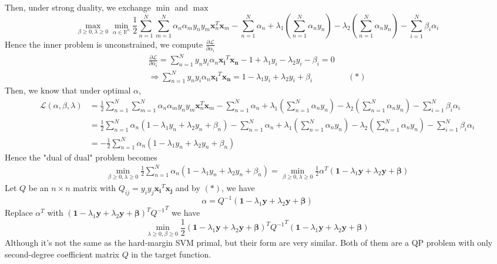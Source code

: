 \documentclass{article}
\begin{document}
\begin{CJK*}{UTF8}{bsmi}
\begin{normalsize}
\begin{enumerate}[label=\textbf{\arabic*}.]
        Then, under strong duality, we exchange $\min$ and $\max$
        \[ \max_{\beta \ge 0, \lambda \ge 0}\min_{\alpha \in \mathbb{R}^n}  \frac{1}{2}\sum_{n=1}^N\sum_{m=1}^N \alpha_n \alpha_m y_n y_m \mathbf{x}_n^T\mathbf{x}_m - \sum_{n=1}^N \alpha_n + \lambda_1(\sum_{n=1}^N \alpha_n y_n) - \lambda_2(\sum_{n=1}^N \alpha_n y_n) - \sum_{i=1}^N \beta_i \alpha_i  \]
        Hence the inner problem is unconstrained, we compute $\frac{\partial \mathcal{L}}{\partial \alpha_i}$
        \begin{align*} \frac{\partial \mathcal{L}}{\partial \alpha_i} = \sum_{n=1}^N y_n y_i \alpha_n \mathbf{x_i}^T\mathbf{x_n} - 1 + \lambda_1 y_i - \lambda_2 y_i - \beta_i = 0\\ \Rightarrow \sum_{n=1}^N y_n y_i \alpha_n \mathbf{x_i}^T\mathbf{x_n} = 1 - \lambda_1 y_i + \lambda_2 y_i + \beta_i && (*) \end{align*}
        Then, we know that under optimal $\alpha$,
        \begin{align*}
            \mathcal{L}(\alpha, \beta, \lambda) &= \frac{1}{2}\sum_{n=1}^N\sum_{m=1}^N \alpha_n \alpha_m y_n y_m \mathbf{x}_n^T\mathbf{x}_m - \sum_{n=1}^N \alpha_n + \lambda_1(\sum_{n=1}^N \alpha_n y_n) - \lambda_2(\sum_{n=1}^N \alpha_n y_n) - \sum_{i=1}^N \beta_i \alpha_i\\
            &= \frac{1}{2}\sum_{n=1}^N \alpha_n (1-\lambda_1 y_n + \lambda_2 y_n + \beta_n) - \sum_{n=1}^N \alpha_n + \lambda_1(\sum_{n=1}^N \alpha_n y_n) - \lambda_2(\sum_{n=1}^N \alpha_n y_n) - \sum_{i=1}^N \beta_i \alpha_i\\
            &= -\frac{1}{2}\sum_{n=1}^N \alpha_n (1-\lambda_1 y_n + \lambda_2 y_n + \beta_n)
        \end{align*}
        Hence the "dual of dual" problem becomes
        \begin{align*} \min_{\beta \ge 0, \lambda \ge 0}\frac{1}{2}\sum_{n=1}^N \alpha_n (1-\lambda_1 y_n + \lambda_2 y_n + \beta_n) = \min_{\beta \ge 0, \lambda \ge 0}\frac{1}{2} \alpha^T(\mathbf{1} - \lambda_1 \mathbf{y} + \lambda_2 \mathbf{y} + \mathbf{\beta})
        \end{align*}
        Let $Q$ be an $n \times n$ matrix with $Q_{ij} = y_i y_j \mathbf{x_i}^T\mathbf{x_j}$ and by $(*)$, we have
        \[ \alpha = Q^{-1}(\mathbf{1} - \lambda_1 \mathbf{y} + \lambda_2 \mathbf{y} + \mathbf{\beta}) \]
        Replace $\alpha^T$ with $(\mathbf{1} - \lambda_1 \mathbf{y} + \lambda_2 \mathbf{y} + \mathbf{\beta})^T{Q^{-1}}^T$ we have
        \[\min_{\lambda \ge 0, \beta \ge 0}\frac{1}{2}(\mathbf{1} - \lambda_1 \mathbf{y} + \lambda_2 \mathbf{y} + \mathbf{\beta})^T{Q^{-1}}^T(\mathbf{1} - \lambda_1 \mathbf{y} + \lambda_2 \mathbf{y} + \mathbf{\beta}) \]
        Although it's not the same as the hard-margin SVM primal, but their form are very similar. Both of them are a QP problem with only second-degree coefficient matrix $Q$ in the target function.
    \end{enumerate}
    \end{normalsize}
\end{CJK*}
\end{document}
